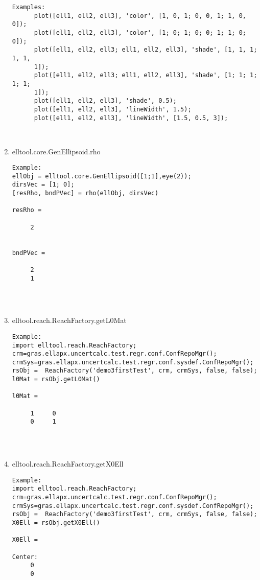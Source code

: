 \begin{enumerate}
\begin{lstlisting}
Examples:
      plot([ell1, ell2, ell3], 'color', [1, 0, 1; 0, 0, 1; 1, 0, 0]);
      plot([ell1, ell2, ell3], 'color', [1; 0; 1; 0; 0; 1; 1; 0; 0]);
      plot([ell1, ell2, ell3; ell1, ell2, ell3], 'shade', [1, 1, 1; 1, 1,
      1]);
      plot([ell1, ell2, ell3; ell1, ell2, ell3], 'shade', [1; 1; 1; 1; 1;
      1]);
      plot([ell1, ell2, ell3], 'shade', 0.5);
      plot([ell1, ell2, ell3], 'lineWidth', 1.5);
      plot([ell1, ell2, ell3], 'lineWidth', [1.5, 0.5, 3]);



\end{lstlisting}
\fontfamily{\familydefault}
\selectfont
\item {elltool.core.GenEllipsoid.rho}
\selectfont
\begin{lstlisting}
Example:
ellObj = elltool.core.GenEllipsoid([1;1],eye(2));
dirsVec = [1; 0];
[resRho, bndPVec] = rho(ellObj, dirsVec)

resRho =

     2


bndPVec =

     2
     1




\end{lstlisting}
\fontfamily{\familydefault}
\selectfont
\item {elltool.reach.ReachFactory.getL0Mat}
\selectfont
\begin{lstlisting}
Example:
import elltool.reach.ReachFactory;
crm=gras.ellapx.uncertcalc.test.regr.conf.ConfRepoMgr();
crmSys=gras.ellapx.uncertcalc.test.regr.conf.sysdef.ConfRepoMgr();
rsObj =  ReachFactory('demo3firstTest', crm, crmSys, false, false);
l0Mat = rsObj.getL0Mat()

l0Mat =

     1     0
     0     1




\end{lstlisting}
\fontfamily{\familydefault}
\selectfont
\item {elltool.reach.ReachFactory.getX0Ell}
\selectfont
\begin{lstlisting}
Example:
import elltool.reach.ReachFactory;
crm=gras.ellapx.uncertcalc.test.regr.conf.ConfRepoMgr();
crmSys=gras.ellapx.uncertcalc.test.regr.conf.sysdef.ConfRepoMgr();
rsObj =  ReachFactory('demo3firstTest', crm, crmSys, false, false);
X0Ell = rsObj.getX0Ell()

X0Ell =

Center:
     0
     0


\end{lstlisting}
\end{enumerate}
